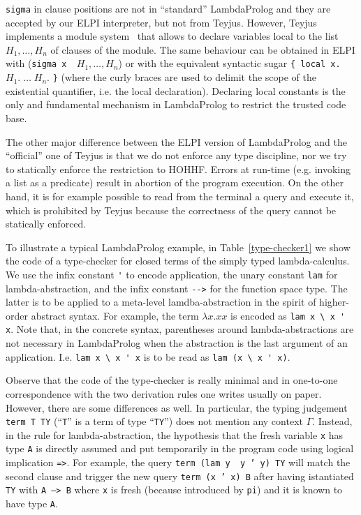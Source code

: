 \documentclass[preprint]{sigplanconf}
\begin{document}
\texttt{sigma} in clause positions are not in ``standard'' LambdaProlog and they are accepted by our ELPI interpreter, but not from Teyjus. However, Teyjus implements a module system~\cite{gopalan1} that allows to declare variables local to the list $H_1,\ldots, H_n$ of clauses of the module. The same behaviour can be obtained in ELPI with (\texttt{sigma x \ }$H_1, \ldots, H_n$) or with the equivalent
syntactic sugar \texttt{\{ local x.} $H_1.\;\ldots\; H_n.$ \texttt{\}} (where the curly braces are used to delimit the scope of the existential quantifier, i.e. the local declaration). Declaring local constants is the only and fundamental mechanism in LambdaProlog to restrict the trusted code base.

The other major difference between the ELPI version of LambdaProlog and the ``official'' one of Teyjus is that we do not enforce any type discipline, nor we try to statically enforce the restriction to HOHHF. Errors at run-time (e.g. invoking a list as a predicate) result in abortion of the program execution. On the other hand, it is for example possible to read from the terminal a query and execute it, which is prohibited by Teyjus because the correctness of the query cannot be statically enforced.

To illustrate a typical LambdaProlog example, in Table~\ref{type-checker1} we show the code of a type-checker for closed terms of the simply typed lambda-calculus. We use the infix constant \verb+'+ to encode application, the unary constant \verb+lam+ for lambda-abstraction, and the infix constant \verb+-->+ for the function space type. The latter is to be applied to a meta-level lamdba-abstraction in the spirit of higher-order abstract syntax. For example, the term $\lambda x.xx$ is encoded as \verb+lam x \ x ' x+. Note that, in the concrete syntax, parentheses around lambda-abstractions are not necessary in LambdaProlog when the abstraction is the last argument of an application. I.e. \verb+lam x \ x ' x+ is to be read as \verb+lam (x \ x ' x)+.

Observe that the code of the type-checker is really minimal and in one-to-one correspondence with the two derivation rules one writes usually on paper. However, there are some differences as well. In particular, the typing judgement \texttt{term T TY} (``\texttt{T}'' is a term of type ``\texttt{TY}'') does not mention any context $\Gamma$. Instead, in the rule for lambda-abstraction, the hypothesis that the fresh variable \texttt{x} has type \texttt{A} is directly assumed and put temporarily in the program code using logical implication \texttt{=>}.
For example, the query \texttt{term (lam y \ y ' y) TY} will match the second
clause and trigger the new query \texttt{term (x ' x) B} after having istantiated \texttt{TY} with \texttt{A --> B} where \texttt{x} is fresh (because introduced by \texttt{pi}) and it is known to have type \texttt{A}.
\end{document}
